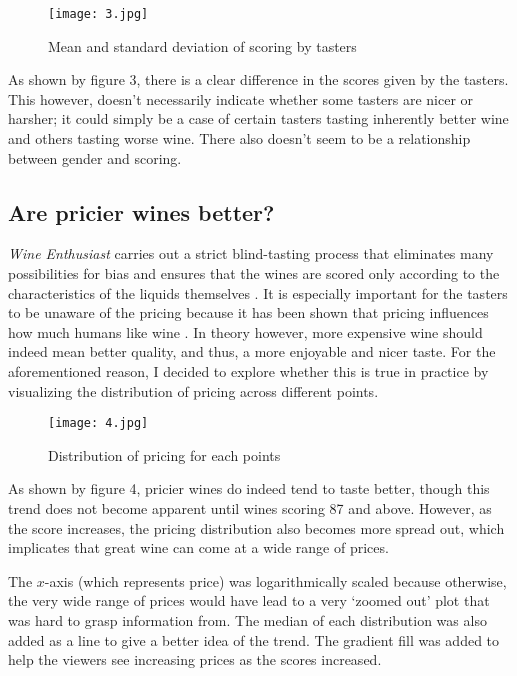 \begin{figure}[h]
  \texttt{[image: 3.jpg]} 
  \caption{Mean and standard deviation of scoring by tasters} %
\end{figure}

As shown by figure 3, there is a clear difference in the scores given by the tasters. This however, doesn't necessarily indicate whether some tasters are nicer or harsher; it could simply be a case of certain tasters tasting inherently better wine and others tasting worse wine. There also doesn't seem to be a relationship between gender and scoring.

\subsection{Are pricier wines better?}
\emph{Wine Enthusiast} carries out a strict blind-tasting process that eliminates many possibilities for bias and ensures that the wines are scored only according to the characteristics of the liquids themselves \cite{WineMag}. It is especially important for the tasters to be unaware of the pricing because it has been shown that pricing influences how much humans like wine \cite{SchmidtSkvortsova2017}. In theory however, more expensive wine should indeed mean better quality, and thus, a more enjoyable and nicer taste. For the aforementioned reason, I decided to explore whether this is true in practice by visualizing the distribution of pricing across different points.


\begin{figure}[h]
  \texttt{[image: 4.jpg]}
  \caption{Distribution of pricing for each points} %
\end{figure}

As shown by figure 4, pricier wines do indeed tend to taste better, though this trend does not become apparent until wines scoring 87 and above. However, as the score increases, the pricing distribution also becomes more spread out, which implicates that great wine can come at a wide range of prices.

The $x$-axis (which represents price) was logarithmically scaled because otherwise, the very wide range of prices would have lead to a very `zoomed out' plot that was hard to grasp information from. The median of each distribution was also added as a line to give a better idea of the trend. The gradient fill was added to help the viewers see increasing prices as the scores increased.

